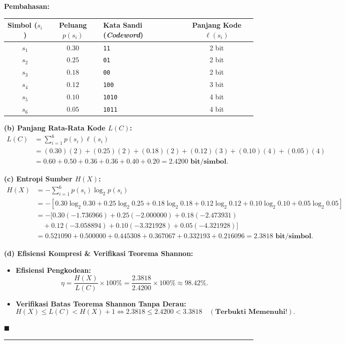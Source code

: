\documentclass[11pt,a4paper]{article}
\newenvironment{solusi}{\noindent\textbf{\textsf{Pembahasan:}}\par\vspace{0.2em}}{\hfill$\blacksquare$\vspace{1em}\par\hrule\vspace{1em}}
\begin{document}
\begin{solusi}
\begin{center}
\begin{tabular}{c c l c}
\toprule
\textbf{Simbol ($s_i$)} & \textbf{Peluang $p(s_i)$} & \textbf{Kata Sandi (\textit{Codeword})} & \textbf{Panjang Kode $\ell(s_i)$} \\
\midrule
$s_1$ & $0.30$ & \texttt{11}   & 2 bit \\
$s_2$ & $0.25$ & \texttt{01}   & 2 bit \\
$s_3$ & $0.18$ & \texttt{00}   & 2 bit \\
$s_4$ & $0.12$ & \texttt{100}  & 3 bit \\
$s_5$ & $0.10$ & \texttt{1010} & 4 bit \\
$s_6$ & $0.05$ & \texttt{1011} & 4 bit \\
\bottomrule
\end{tabular}
\end{center}

\vspace{0.2cm}
\textbf{(b) Panjang Rata-Rata Kode $L(C)$:}
\begin{align*}
L(C) &= \sum_{i=1}^6 p(s_i) \ell(s_i) \\
&= (0.30)(2) + (0.25)(2) + (0.18)(2) + (0.12)(3) + (0.10)(4) + (0.05)(4) \\
&= 0.60 + 0.50 + 0.36 + 0.36 + 0.40 + 0.20 = \mathbf{2.4200 \text{ bit/simbol}}.
\end{align*}

\vspace{0.2cm}
\textbf{(c) Entropi Sumber $H(X)$:}
\begin{align*}
H(X) &= -\sum_{i=1}^6 p(s_i) \log_2 p(s_i) \\
&= -[0.30\log_2 0.30 + 0.25\log_2 0.25 + 0.18\log_2 0.18 + 0.12\log_2 0.12 + 0.10\log_2 0.10 + 0.05\log_2 0.05] \\
&= -[0.30(-1.736966) + 0.25(-2.000000) + 0.18(-2.473931) \\
&\quad + 0.12(-3.058894) + 0.10(-3.321928) + 0.05(-4.321928)] \\
&= 0.521090 + 0.500000 + 0.445308 + 0.367067 + 0.332193 + 0.216096 = \mathbf{2.3818 \text{ bit/simbol}}.
\end{align*}

\vspace{0.2cm}
\textbf{(d) Efisiensi Kompresi \& Verifikasi Teorema Shannon:}
\begin{itemize}[leftmargin=*]
    \item \textbf{Efisiensi Pengkodean:}
    \[
    \eta = \frac{H(X)}{L(C)} \times 100\% = \frac{2.3818}{2.4200} \times 100\% \approx \mathbf{98.42\%}.
    \]
    \item \textbf{Verifikasi Batas Teorema Shannon Tanpa Derau:}
    \[
    H(X) \le L(C) < H(X) + 1 \iff \mathbf{2.3818 \le 2.4200 < 3.3818} \quad (\textbf{Terbukti Memenuhi!}).
    \]
\end{itemize}
\end{solusi}
\end{document}
